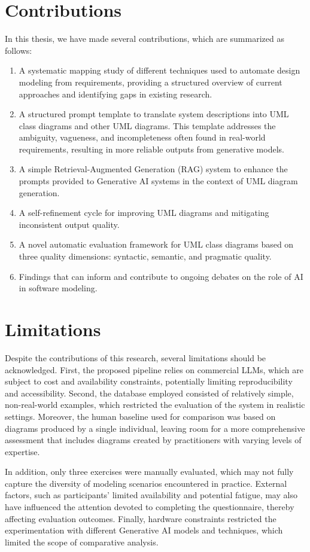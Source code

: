 \section{Contributions}
In this thesis, we have made several contributions, which are summarized as follows:

\begin{enumerate}
    \item A systematic mapping study of different techniques used to automate design modeling from requirements, providing a structured overview of current approaches and identifying gaps in existing research.
    \item A structured prompt template to translate system descriptions into UML class diagrams and other UML diagrams. This template addresses the ambiguity, vagueness, and incompleteness often found in real-world requirements, resulting in more reliable outputs from generative models.
    \item A simple Retrieval-Augmented Generation (RAG) system to enhance the prompts provided to Generative AI systems in the context of UML diagram generation.
    \item A self-refinement cycle for improving UML diagrams and mitigating inconsistent output quality.
    \item A novel automatic evaluation framework for UML class diagrams based on three quality dimensions: syntactic, semantic, and pragmatic quality.
    \item Findings that can inform and contribute to ongoing debates on the role of AI in software modeling.
\end{enumerate}
\section{Limitations}
Despite the contributions of this research, several limitations should be acknowledged. First, the proposed pipeline relies on commercial LLMs, which are subject to cost and availability constraints, potentially limiting reproducibility and accessibility. Second, the database employed consisted of relatively simple, non-real-world examples, which restricted the evaluation of the system in realistic settings. Moreover, the human baseline used for comparison was based on diagrams produced by a single individual, leaving room for a more comprehensive assessment that includes diagrams created by practitioners with varying levels of expertise.

In addition, only three exercises were manually evaluated, which may not fully capture the diversity of modeling scenarios encountered in practice. External factors, such as participants’ limited availability and potential fatigue, may also have influenced the attention devoted to completing the questionnaire, thereby affecting evaluation outcomes. Finally, hardware constraints restricted the experimentation with different Generative AI models and techniques, which limited the scope of comparative analysis.
